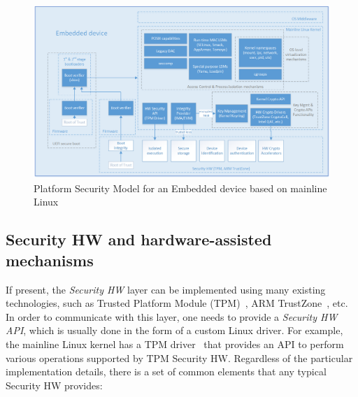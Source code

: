 \begin{figure}[t]
	\centering
		\includegraphics[width=1\textwidth]{figures/LinuxKernelPlatSecModel.png}
	\caption{Platform Security Model for an Embedded device based on mainline Linux}
	\label{fig:platsec}
\end{figure}

\subsection{Security HW and hardware-assisted mechanisms}

If present, the \textit{Security HW} layer can be implemented using many existing technologies, such as Trusted Platform Module (TPM)~\cite{tpm}, ARM TrustZone~\cite{trustzone}, etc. In order to communicate with this layer, one needs to provide a \textit{Security HW API}, which is usually done in the form of a custom Linux driver. For example, the mainline Linux kernel has a TPM driver~\cite{tpmdriver} that provides an API to perform various operations supported by TPM Security HW. Regardless of the particular implementation details, there is a set of common elements that any typical Security HW provides:

